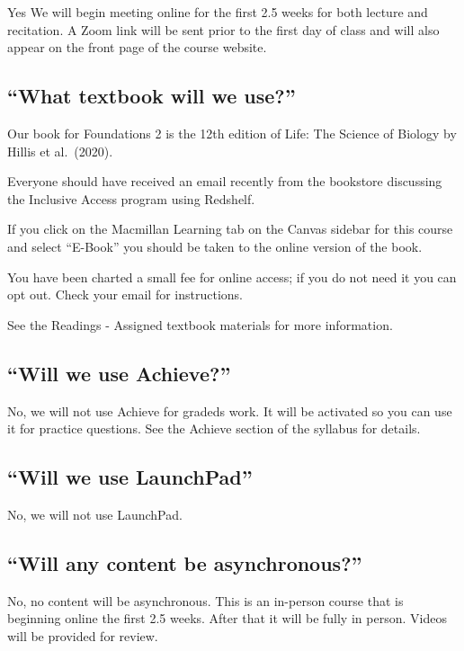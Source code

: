 \documentclass[
]{book}
\begin{document}
Yes We will begin meeting online for the first 2.5 weeks for both lecture and recitation. A Zoom link will be sent prior to the first day of class and will also appear on the front page of the course website.

\hypertarget{what-textbook-will-we-use}{%
\subsection{``What textbook will we use?''}\label{what-textbook-will-we-use}}

Our book for Foundations 2 is the 12th edition of Life: The Science of Biology by Hillis et al.~(2020).

Everyone should have received an email recently from the bookstore discussing the Inclusive Access program using Redshelf.

If you click on the Macmillan Learning tab on the Canvas sidebar for this course and select ``E-Book'' you should be taken to the online version of the book.

You have been charted a small fee for online access; if you do not need it you can opt out. Check your email for instructions.

See the Readings - Assigned textbook materials for more information.

\hypertarget{will-we-use-achieve}{%
\subsection{``Will we use Achieve?''}\label{will-we-use-achieve}}

No, we will not use Achieve for gradeds work. It will be activated so you can use it for practice questions. See the Achieve section of the syllabus for details.

\hypertarget{will-we-use-launchpad}{%
\subsection{``Will we use LaunchPad''}\label{will-we-use-launchpad}}

No, we will not use LaunchPad.

\hypertarget{will-any-content-be-asynchronous}{%
\subsection{``Will any content be asynchronous?''}\label{will-any-content-be-asynchronous}}

No, no content will be asynchronous. This is an in-person course that is beginning online the first 2.5 weeks. After that it will be fully in person. Videos will be provided for review.
\end{document}
